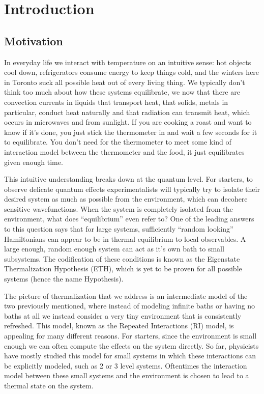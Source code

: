 \chapter{Introduction}

\section{Motivation}

In everyday life we interact with temperature on an intuitive sense: hot objects cool down, refrigerators consume energy to keep things cold, and the winters here in Toronto suck all possible heat out of every living thing. We typically don't think too much about how these systems equilibrate, we now that there are convection currents in liquids that transport heat, that solids, metals in particular, conduct heat naturally and that radiation can transmit heat, which occurs in microwaves and from sunlight. If you are cooking a roast and want to know if it's done, you just stick the thermometer in and wait a few seconds for it to equilibrate. You don't need for the thermometer to meet some kind of interaction model between the thermometer and the food, it just equilibrates given enough time. 

This intuitive understanding breaks down at the quantum level. For starters, to observe delicate quantum effects experimentalists will typically try to isolate their desired system as much as possible from the environment, which can decohere sensitive wavefunctions. When the system is completely isolated from the environment, what does ``equilibrium'' even refer to? One of the leading answers to this question says that for large systems, sufficiently ``random looking'' Hamiltonians can appear to be in thermal equilibrium to local observables. A large enough, random enough system can act as it's own bath to small subsystems. The codification of these conditions is known as the Eigenstate Thermalization Hypothesis (ETH), which is yet to be proven for all possible systems (hence the name Hypothesis).

The picture of thermalization that we address is an intermediate model of the two previously mentioned, where instead of modeling infinite baths or having no baths at all we instead consider a very tiny environment that is consistently refreshed. This model, known as the Repeated Interactions (RI) model, is appealing for many different reasons. For starters, since the environment is small enough we can often compute the effects on the system directly. So far, physicists have mostly studied this model for small systems in which these interactions can be explicitly modeled, such as 2 or 3 level systems. Oftentimes the interaction model between these small systems and the environment is chosen to lead to a thermal state on the system.

